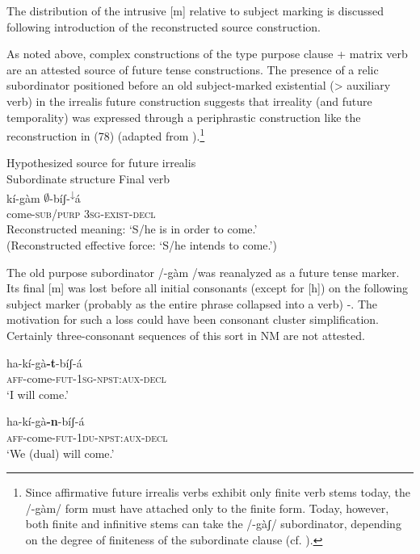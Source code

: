 \documentclass[output=paper]{langsci/langscibook}
\begin{document}
The distribution of the intrusive [m] relative to subject marking is discussed following introduction of the reconstructed source construction. 

As noted above, complex constructions of the type purpose clause + matrix verb are an attested source of future tense constructions. The presence of a relic subordinator positioned before an old subject-marked existential ({\textgreater} auxiliary verb) in the irrealis future construction suggests that irreality (and future temporality) was expressed through a periphrastic construction like the reconstruction in (78) (adapted from \citealt[11]{Ahland2014b}).\footnote{Since affirmative future irrealis verbs exhibit only finite verb stems today, the /-g\`{a}m/ form must have attached only to the finite form. Today, however, both finite and infinitive stems can take the /-g\`{a}ʃ/ subordinator, depending on the degree of finiteness of the subordinate clause (cf. \citealt[629]{Ahland2012}).}

\ea\label{ex:mahland:78}
Hypothesized source for future irrealis\\
Subordinate structure   Final verb\\
\gll  k\'{i}{}-g\`{a}m        ${\emptyset}${}-b\'{i}ʃ-\textsuperscript{↓}\'{a}\\
  come-\textsc{sub/purp}    \textsc{3sg-exist-decl} \\
  \glt Reconstructed meaning: `S/he is in order to come.'\\
  (Reconstructed effective force: `S/he intends to come.') 
  \z
  
  The old purpose subordinator /{}-g\`{a}m /was reanalyzed as a future tense marker. Its final [m] was lost before all initial consonants (except for [h]) on the following subject marker (probably as the entire phrase collapsed into a verb) -. The motivation for such a loss could have been consonant cluster simplification. Certainly three-consonant sequences of this sort in NM are not attested. 

\ea\label{ex:mahland:79}
\gll ha-k\'{i}-g\`{a}\textbf{{}-t}{}-b\'{i}ʃ-\'{a} \\
\textsc{aff}{}-come-\textsc{fut-1sg-npst:aux-decl} \\
\glt `I will come.'
\z

\ea\label{ex:mahland:80}
\gll ha-k\'{i}-g\`{a}\textbf{{}-n}{}-b\'{i}ʃ-\'{a} \\
\textsc{aff}{}-come-\textsc{fut-1du-npst:aux-decl} \\
\glt `We (dual) will come.'
\z
\end{document}
